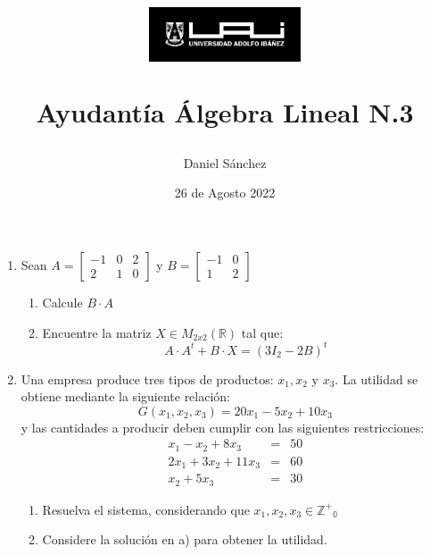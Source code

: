 \documentclass[12pt]{article}
\begin{document}
\title{
    \begin{figure}[ht]
        \centering
        \includegraphics[width = 0.4\textwidth, ]{../../logo-uai.jpg}\\
    \end{figure}
    Ayudant\'ia \'Algebra Lineal N.3}
\date{26 de Agosto 2022}
\author{Daniel S\'anchez}
\maketitle

\begin{enumerate}
    \item Sean $A= \begin{bmatrix}
                  -1 & 0 & 2 \\
                  2  & 1 & 0
              \end{bmatrix}$ y $B=\begin{bmatrix}
                  -1 & 0 \\
                  1  & 2
              \end{bmatrix}$
          \begin{enumerate}
              \item Calcule $B\cdot A$
              \item Encuentre la matriz $X \in M_{2x2}(\mathbb{R})$ tal que:
                    $$A\cdot A^t+B\cdot X=(3I_2-2B)^t$$
          \end{enumerate}
          
    \item Una empresa produce tres tipos de productos: $x_1, x_2 \mbox{ y }x_3$. La utilidad
          se obtiene mediante la siguiente relaci\'on:
          $$G(x_1,x_2,x_3)=20x_1-5x_2+10x_3$$
          y las cantidades a producir deben cumplir con las siguientes restricciones:
          $$\begin{array}{rcl}
                  x_1 - x_2 + 8x_3    & = & 50 \\
                  2x_1 + 3x_2 + 11x_3 & = & 60 \\
                  x_2 + 5x_3          & = & 30
              \end{array}$$
          \begin{enumerate}
              \item Resuelva el sistema, considerando que $x_1,x_2,x_3 \in \mathbb{{Z^+}_0}$
              \item Considere la soluci\'on en a) para obtener la utilidad.
          \end{enumerate}
          

\end{enumerate}
\end{document}
